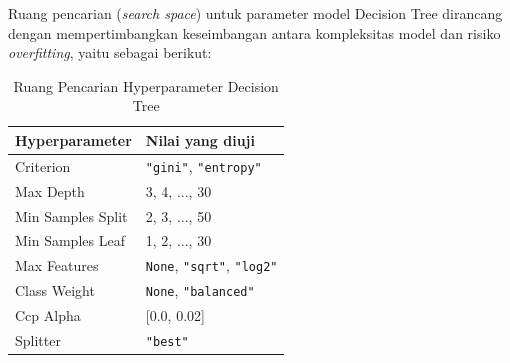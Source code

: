 Ruang pencarian (\textit{search space}) untuk parameter model Decision Tree dirancang dengan mempertimbangkan keseimbangan antara kompleksitas model dan risiko \textit{overfitting}, yaitu sebagai berikut:

\begin{table}[H]
    \centering
    \caption{Ruang Pencarian Hyperparameter Decision Tree}
    \label{tab:search_space_decision_tree}
    \begin{tabular}{|l|l|}
        \hline
        \textbf{Hyperparameter} & \textbf{Nilai yang diuji} \\ \hline
        Criterion & \texttt{"gini"}, \texttt{"entropy"} \\ \hline
        Max Depth & 3, 4, ..., 30 \\ \hline
        Min Samples Split & 2, 3, ..., 50 \\ \hline
        Min Samples Leaf & 1, 2, ..., 30 \\ \hline
        Max Features & \texttt{None}, \texttt{"sqrt"}, \texttt{"log2"} \\ \hline
        Class Weight & \texttt{None}, \texttt{"balanced"} \\ \hline
        Ccp Alpha & [0.0, 0.02] \\ \hline
        Splitter & \texttt{"best"} \\ \hline
    \end{tabular}
\end{table}

